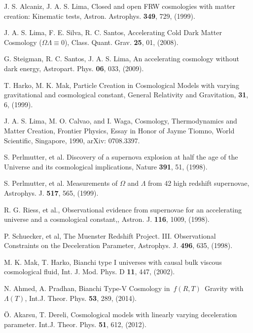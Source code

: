 \documentclass[superscriptaddress,showpacs,pre,twocolumn]{revtex4-1}
\begin{document}
\begin{thebibliography}{99}
 J. S. Alcaniz, J. A. S. Lima, Closed and open FRW cosmologies with matter creation: Kinematic tests, Astron. Astrophys. \textbf{349}, 729, (1999).

 J. A. S. Lima, F. E. Silva, R. C. Santos, Accelerating Cold Dark Matter Cosmology ($\Omega \Lambda\equiv 0$), Class. Quant. Grav. \textbf{25}, 01, (2008).

 G. Steigman, R. C. Santos, J. A. S. Lima, An accelerating cosmology without dark energy, Astropart. Phys. \textbf{06}, 033, (2009).

 T. Harko, M. K. Mak, Particle Creation in Cosmological Models with varying gravitational and cosmological constant, General Relativity and Gravitation, \textbf{31}, 6, (1999). 

 J. A. S. Lima, M. O. Calvao, and I. Waga, Cosmology, Thermodynamics and Matter Creation, Frontier Physics, Essay in Honor of Jayme Tiomno, World Scientific, Singapore, 1990, arXiv: 0708.3397.


 S. Perlmutter, et al. Discovery of a supernova explosion at half the age of the Universe and its cosmological implications, Nature \textbf{391}, 51, (1998).

 S. Perlmutter, et al. Measurements of $\Omega$ and $\Lambda$ from 42 high redshift supernovae, Astrophys. J. \textbf{517}, 565, (1999).

 R. G. Riess, et al., Observational evidence from supernovae for an accelerating universe and a cosmological constant,, Astron. J. \textbf{116}, 1009, (1998).

 P. Schuecker, et al, The Muenster Redshift Project. III. Observational Constraints on the Deceleration Parameter, Astrophys. J. \textbf{496}, 635, (1998).

 M. K. Mak, T. Harko, Bianchi type I universes with causal bulk viscous cosmological fluid, Int. J. Mod. Phys. D \textbf{11}, 447, (2002).

 N. Ahmed, A. Pradhan, Bianchi Type-V Cosmology in $f(R,T)$ Gravity with $\Lambda(T)$, Int.J. Theor. Phys. \textbf{53}, 289, (2014).

  Ö. Akarsu, T. Dereli, Cosmological models with linearly varying deceleration parameter. Int.J. Theor. Phys. \textbf{51}, 612, (2012).


\end{thebibliography}
\end{document}
